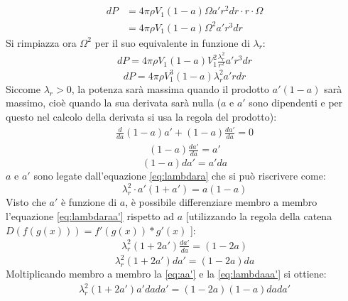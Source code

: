 \begin{align*}
dP &= 4 \pi \rho V_1 \left( 1-a \right) \Omega a' r^2 dr \cdot r \cdot \Omega \\
&= 4 \pi \rho V_1 \left( 1-a \right) \Omega^2 a' r^3 dr
\end{align*}
Si rimpiazza ora $\Omega^2$ per il suo equivalente in funzione di $\lambda_r$:
\begin{align*}
dP = 4 \pi \rho V_1 \left( 1- a \right) V_1^2 \frac{\lambda_r^2}{r^2} a' r^3 dr
\end{align*}
\begin{equation}\label{eq:dP}
dP = 4 \pi \rho V_1^3 \left( 1 - a \right) \lambda_r^2 a' r dr
\end{equation}
Siccome $\lambda_r > 0$, la potenza sarà massima quando il prodotto $a' \left( 1- a \right)$ sarà massimo, cioè quando la sua derivata sarà nulla ($a$ e $a'$ sono dipendenti e per questo nel calcolo della derivata si usa la regola del prodotto):
\begin{align*}
\frac{d}{da} \left( 1-a \right) a' + \left( 1 -a \right) \frac{da'}{da} = 0
\end{align*}
\begin{align*}
\left( 1- a \right) \frac{da'}{da} = a'
\end{align*}
\begin{equation}\label{eq:aa'}
\left(1 - a \right) da' = a' da
\end{equation}
$a$ e $a'$ sono legate dall'equazione \ref{eq:lambdara} che si può riscrivere come:
\begin{equation}\label{eq:lambdaraa'}
\lambda_r^2 \cdot a' \left( 1+ a' \right) = a \left( 1 - a \right)
\end{equation}
Visto che $a'$ è funzione di $a$, è possibile differenziare membro a membro l'equazione \ref{eq:lambdaraa'} rispetto ad $a$ [utilizzando la regola della catena $D(f(g(x)))=f'(g(x))*g'(x)$ ]:
\begin{align*}
\lambda_r^2 \left( 1+ 2a' \right) \frac{da'}{da} = \left( 1 - 2a \right)
\end{align*}
\begin{equation}\label{eq:lambdaaa'}
\lambda_r^2 \left( 1+ 2a' \right) da' = \left( 1 - 2a \right)da
\end{equation}
Moltiplicando membro a membro la \ref{eq:aa'} e la \ref{eq:lambdaaa'} si ottiene:
\begin{align*}
\lambda_r^2 \left( 1 + 2a' \right) a' da da' = \left( 1 - 2a \right) \left( 1-a \right) da da'
\end{align*}
